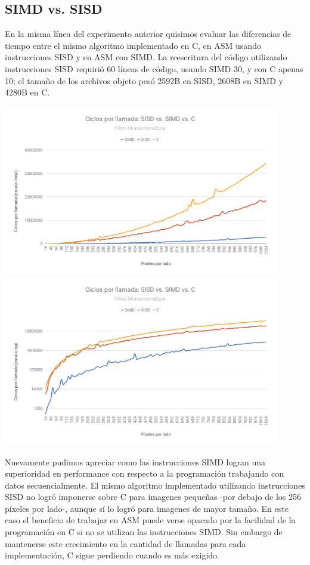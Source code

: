 \newpage
\subsection{SIMD vs. SISD}

En la misma línea del experimento anterior quisimos evaluar las diferencias de tiempo entre el mismo algoritmo implementado en C, en ASM usando instrucciones SISD y en ASM con SIMD. La reescritura del código utilizando instrucciones SISD requirió 60 líneas de código, usando SIMD 30, y con C apenas 10; el tamaño de los archivos objeto pesó 2592B en SISD, 2608B en SIMD y 4280B en C.

\begin{center}

	\includegraphics[width=0.9\textwidth]{imagenes/simdsisd/SIMDvsSISDvsClin.png} \\
	\includegraphics[width=0.9\textwidth]{imagenes/simdsisd/SIMDvsSISDvsClog.png}

\end{center}

Nuevamente pudimos apreciar como las instrucciones SIMD logran una superioridad en performance con respecto a la programación trabajando con datos secuencialmente. El mismo algoritmo implementado utilizando instrucciones SISD no logró imponerse sobre C para imagenes pequeñas -por debajo de los 256 píxeles por lado-, aunque sí lo logró para imagenes de mayor tamaño. En este caso el beneficio de trabajar en ASM puede verse opacado por la facilidad de la programación en C si no se utilizan las instrucciones SIMD. Sin embargo de mantenerse este crecimiento en la cantidad de llamadas para cada implementación, C sigue perdiendo cuando es más exigido.

